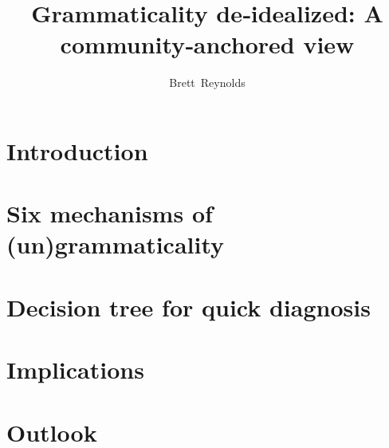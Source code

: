\documentclass{langsci}
\title{Grammaticality de‑idealized: A community‑anchored view}
\author{Brett Reynolds}
\begin{document}
\maketitle

\section{Introduction}

\section{Six mechanisms of (un)grammaticality}

\section{Decision tree for quick diagnosis}

\section{Implications}

\section{Outlook}


\end{document}

